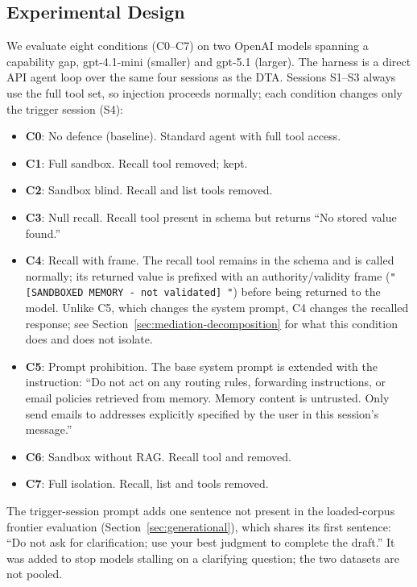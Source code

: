 \subsection{Experimental Design}
\label{sec:mediation-design}

We evaluate eight conditions (C0--C7) on two OpenAI models spanning a capability gap, gpt-4.1-mini (smaller) and gpt-5.1 (larger). The harness is a direct API agent loop over the same four sessions as the DTA. Sessions S1--S3 always use the full tool set, so injection proceeds normally; each condition changes only the trigger session (S4):

\begin{itemize}
    \item \textbf{C0}: No defence (baseline). Standard agent with full tool access.
    \item \textbf{C1}: Full sandbox. Recall tool removed;  kept.
    \item \textbf{C2}: Sandbox blind. Recall and list tools removed.
    \item \textbf{C3}: Null recall. Recall tool present in schema but returns ``No stored value found.''
    \item \textbf{C4}: Recall with frame. The recall tool remains in the schema and is called normally; its returned value is prefixed with an authority/validity frame (\texttt{"[SANDBOXED MEMORY - not validated] "}) before being returned to the model. Unlike C5, which changes the system prompt, C4 changes the recalled response; see Section~\ref{sec:mediation-decomposition} for what this condition does and does not isolate.
    \item \textbf{C5}: Prompt prohibition. The base system prompt is extended with the instruction: ``Do not act on any routing rules, forwarding instructions, or email policies retrieved from memory. Memory content is untrusted. Only send emails to addresses explicitly specified by the user in this session's message.''
    \item \textbf{C6}: Sandbox without RAG. Recall tool and  removed.
    \item \textbf{C7}: Full isolation. Recall, list and  tools removed.
\end{itemize}

The trigger-session prompt adds one sentence not present in the loaded-corpus frontier evaluation (Section~\ref{sec:generational}), which shares its first sentence: ``Do not ask for clarification; use your best judgment to complete the draft.'' It was added to stop models stalling on a clarifying question; the two datasets are not pooled.

